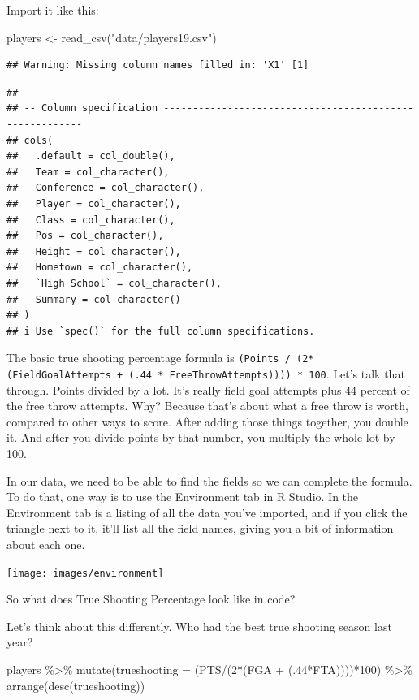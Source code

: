 \documentclass[
]{book}
\newenvironment{Shaded}{\begin{snugshade}}{\end{snugshade}}
\newcommand{\AttributeTok}[1]{\textcolor[rgb]{0.77,0.63,0.00}{#1}}
\newcommand{\DecValTok}[1]{\textcolor[rgb]{0.00,0.00,0.81}{#1}}
\newcommand{\FunctionTok}[1]{\textcolor[rgb]{0.00,0.00,0.00}{#1}}
\newcommand{\NormalTok}[1]{#1}
\newcommand{\OtherTok}[1]{\textcolor[rgb]{0.56,0.35,0.01}{#1}}
\newcommand{\SpecialCharTok}[1]{\textcolor[rgb]{0.00,0.00,0.00}{#1}}
\newcommand{\StringTok}[1]{\textcolor[rgb]{0.31,0.60,0.02}{#1}}
\begin{document}
Import it like this:

\begin{Shaded}
\begin{Highlighting}[]
\NormalTok{players }\OtherTok{\textless{}{-}} \FunctionTok{read\_csv}\NormalTok{(}\StringTok{"data/players19.csv"}\NormalTok{)}
\end{Highlighting}
\end{Shaded}

\begin{verbatim}
## Warning: Missing column names filled in: 'X1' [1]
\end{verbatim}

\begin{verbatim}
## 
## -- Column specification --------------------------------------------------------
## cols(
##   .default = col_double(),
##   Team = col_character(),
##   Conference = col_character(),
##   Player = col_character(),
##   Class = col_character(),
##   Pos = col_character(),
##   Height = col_character(),
##   Hometown = col_character(),
##   `High School` = col_character(),
##   Summary = col_character()
## )
## i Use `spec()` for the full column specifications.
\end{verbatim}

The basic true shooting percentage formula is \texttt{(Points\ /\ (2*(FieldGoalAttempts\ +\ (.44\ *\ FreeThrowAttempts))))\ *\ 100}. Let's talk that through. Points divided by a lot. It's really field goal attempts plus 44 percent of the free throw attempts. Why? Because that's about what a free throw is worth, compared to other ways to score. After adding those things together, you double it. And after you divide points by that number, you multiply the whole lot by 100.

In our data, we need to be able to find the fields so we can complete the formula. To do that, one way is to use the Environment tab in R Studio. In the Environment tab is a listing of all the data you've imported, and if you click the triangle next to it, it'll list all the field names, giving you a bit of information about each one.

\texttt{[image: images/environment]}

So what does True Shooting Percentage look like in code?

Let's think about this differently. Who had the best true shooting season last year?

\begin{Shaded}
\begin{Highlighting}[]
\NormalTok{players }\SpecialCharTok{\%\textgreater{}\%}
  \FunctionTok{mutate}\NormalTok{(}\AttributeTok{trueshooting =}\NormalTok{ (PTS}\SpecialCharTok{/}\NormalTok{(}\DecValTok{2}\SpecialCharTok{*}\NormalTok{(FGA }\SpecialCharTok{+}\NormalTok{ (.}\DecValTok{44}\SpecialCharTok{*}\NormalTok{FTA))))}\SpecialCharTok{*}\DecValTok{100}\NormalTok{) }\SpecialCharTok{\%\textgreater{}\%}
  \FunctionTok{arrange}\NormalTok{(}\FunctionTok{desc}\NormalTok{(trueshooting))}
\end{Highlighting}
\end{Shaded}
\end{document}
